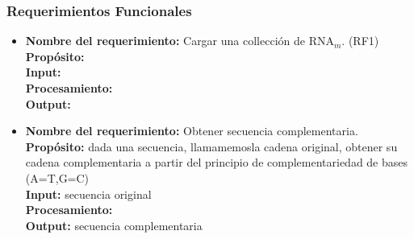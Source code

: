 \documentclass[12pt,a4paper,english,spanish]{article}
\begin{document}
	\subsubsection{Requerimientos Funcionales}
	\begin{itemize}
		\item \textbf{Nombre del requerimiento:} Cargar una collección de RNA$_m$. (RF1)\\
 	    \textbf{Propósito:} \\
		\textbf{Input:} \\
		\textbf{Procesamiento:} \\
		\textbf{Output:} \\

		\item \textbf{Nombre del requerimiento:} Obtener secuencia complementaria.\\
		\textbf{Propósito:} dada una secuencia, llamamemosla cadena original, obtener su cadena complementaria a partir del principio de 										complementariedad de bases (A=T,G=C)\\
		\textbf{Input:} secuencia original\\
		\textbf{Procesamiento:} \\
		\textbf{Output:} secuencia complementaria\\

			





\end{itemize}
\end{document}
